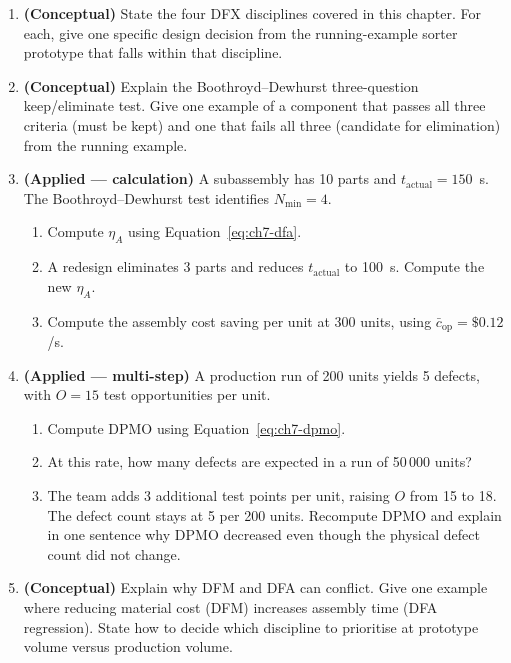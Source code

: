 \begin{enumerate}

  \item \textbf{(Conceptual)} State the four DFX disciplines covered in this
  chapter.
  For each, give one specific design decision from the running-example sorter
  prototype that falls within that discipline.

  \item \textbf{(Conceptual)} Explain the Boothroyd--Dewhurst three-question
  keep/eliminate test.
  Give one example of a component that passes all three criteria (must be kept)
  and one that fails all three (candidate for elimination) from the running
  example.

  \item \textbf{(Applied --- calculation)} A subassembly has 10 parts and
  $t_{\text{actual}} = 150$~s.
  The Boothroyd--Dewhurst test identifies $N_{\min} = 4$.
  \begin{enumerate}
    \item[(a)] Compute $\eta_A$ using Equation~\ref{eq:ch7-dfa}.
    \item[(b)] A redesign eliminates 3 parts and reduces $t_{\text{actual}}$ to
               100~s.
               Compute the new $\eta_A$.
    \item[(c)] Compute the assembly cost saving per unit at 300 units, using
               $\bar{c}_{\text{op}} = \$0.12$/s.
  \end{enumerate}

  \item \textbf{(Applied --- multi-step)} A production run of 200 units yields
  5 defects, with $O = 15$ test opportunities per unit.
  \begin{enumerate}
    \item[(a)] Compute DPMO using Equation~\ref{eq:ch7-dpmo}.
    \item[(b)] At this rate, how many defects are expected in a run of
               50\,000 units?
    \item[(c)] The team adds 3 additional test points per unit, raising $O$
               from 15 to 18.
               The defect count stays at 5 per 200 units.
               Recompute DPMO and explain in one sentence why DPMO decreased
               even though the physical defect count did not change.
  \end{enumerate}

  \item \textbf{(Conceptual)} Explain why DFM and DFA can conflict.
  Give one example where reducing material cost (DFM) increases assembly time
  (DFA regression).
  State how to decide which discipline to prioritise at prototype volume versus
  production volume.

\end{enumerate}

